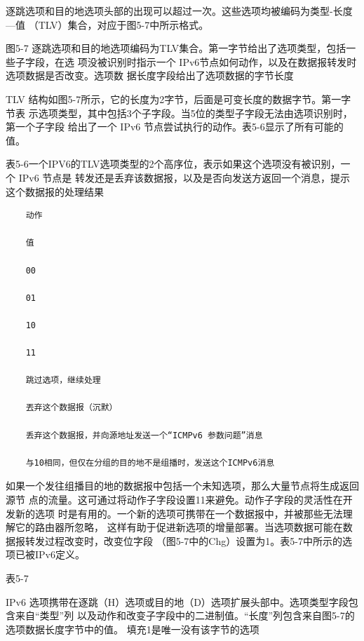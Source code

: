 逐跳选项和目的地选项头部的出现可以超过一次。这些选项均被编码为类型-长度—值
（TLV）集合，对应于图5-7中所示格式。

图5-7 逐跳选项和目的地选项编码为TLV集合。第一字节给出了选项类型，包括一些子字段，在选
项没被识别时指示一个 IPv6节点如何动作，以及在数据报转发时选项数据是否改变。选项数
据长度字段给出了选项数据的字节长度

TLV 结构如图5-7所示，它的长度为2字节，后面是可变长度的数据字节。第一字节表
示选项类型，其中包括3个子字段。当5位的类型子字段无法由选项识别时，第一个子字段
给出了一个 IPv6 节点尝试执行的动作。表5-6显示了所有可能的值。

表5-6一个IPV6的TLV选项类型的2个高序位，表示如果这个选项没有被识别，一个 IPv6 节点是
转发还是丢弃该数据报，以及是否向发送方返回一个消息，提示这个数据报的处理结果

\begin{verbatim}
    动作

    值

    00

    01

    10

    11

    跳过选项，继续处理

    丟弃这个数据报（沉默）

    丢弃这个数据报，并向源地址发送一个“ICMPv6 参数问题”消息

    与10相同，但仅在分组的目的地不是组播时，发送这个ICMPv6消息
\end{verbatim}

如果一个发往组播目的地的数据报中包括一个未知选项，那么大量节点将生成返回源节
点的流量。这可通过将动作子字段设置11来避免。动作子字段的灵活性在开发新的选项
时是有用的。一个新的选项可携带在一个数据报中，并被那些无法理解它的路由器所忽略，
这样有助于促进新选项的增量部署。当选项数据可能在数据报转发过程改变时，改变位字段
（图5-7中的Chg）设置为1。表5-7中所示的选项已被IPv6定义。

表5-7

IPv6 选项携带在逐跳（H）选项或目的地（D）选项扩展头部中。选项类型字段包含来自“类型”列
以及动作和改变子字段中的二进制值。“长度”列包含来自图5-7的选项数据长度字节中的值。
填充1是唯一没有该字节的选项

